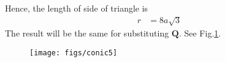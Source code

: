 \documentclass[12pt]{article}
\let\vec\mathbf
\begin{document}
Hence, the length of side of triangle is
\begin{align}
	r &= 8a\sqrt{3}
\end{align}
The result will be the same for substituting $\vec{Q}$. See Fig.\ref{fig:Fig1}.
\begin{figure}[!h]
	\begin{center} 
	    \texttt{[image: figs/conic5]}
	\end{center}
\caption{}
\label{fig:Fig1}
\end{figure}
\end{document}
